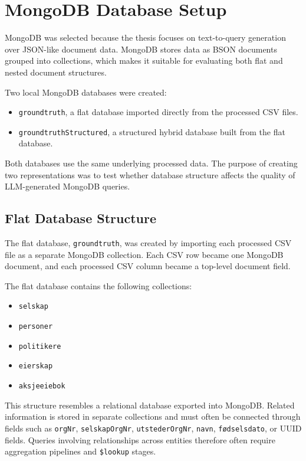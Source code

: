 \section{MongoDB Database Setup}

MongoDB was selected because the thesis focuses on text-to-query generation over JSON-like document data. MongoDB stores data as BSON documents grouped into collections, which makes it suitable for evaluating both flat and nested document structures.

Two local MongoDB databases were created:

\begin{itemize}
    \item \texttt{groundtruth}, a flat database imported directly from the processed CSV files.
    \item \texttt{groundtruthStructured}, a structured hybrid database built from the flat database.
\end{itemize}

Both databases use the same underlying processed data. The purpose of creating two representations was to test whether database structure affects the quality of LLM-generated MongoDB queries.

\subsection{Flat Database Structure}

The flat database, \texttt{groundtruth}, was created by importing each processed CSV file as a separate MongoDB collection. Each CSV row became one MongoDB document, and each processed CSV column became a top-level document field.

The flat database contains the following collections:

\begin{itemize}
    \item \texttt{selskap}
    \item \texttt{personer}
    \item \texttt{politikere}
    \item \texttt{eierskap}
    \item \texttt{aksjeeiebok}
\end{itemize}

This structure resembles a relational database exported into MongoDB. Related information is stored in separate collections and must often be connected through fields such as \texttt{orgNr}, \texttt{selskapOrgNr}, \texttt{utstederOrgNr}, \texttt{navn}, \texttt{fødselsdato}, or UUID fields. Queries involving relationships across entities therefore often require aggregation pipelines and \texttt{\$lookup} stages.

